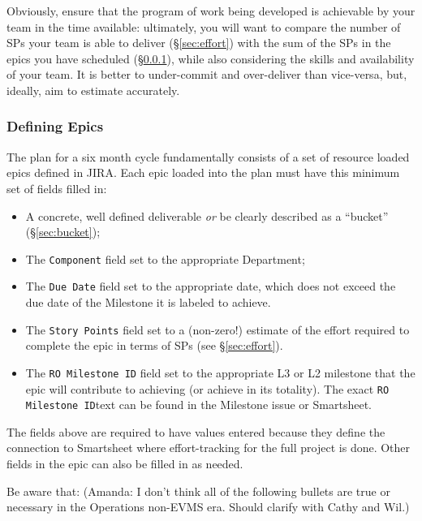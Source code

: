 Obviously, ensure that the program of work being developed is achievable by your team in the time available: ultimately, you will want to compare the number of \glspl{SP} your team is able to deliver (\S\ref{sec:effort}) with the sum of the \glspl{SP} in the \glspl{epic} you have scheduled (\S\ref{sec:planning-epics}), while also considering the skills and availability of your team.
It is better to under-commit and over-deliver than vice-versa, but, ideally, aim to estimate accurately.

\subsubsection{Defining Epics}
\label{sec:planning-epics}

The plan for a six month \gls{cycle} fundamentally consists of a set of resource loaded \glspl{epic} defined in \gls{JIRA}.
Each \gls{epic} loaded into the plan must have this minimum set of fields filled in:

\begin{itemize}
\item
  A concrete, well defined deliverable \emph{or} be clearly described as a ``bucket'' (\S\ref{sec:bucket});
\item
  The \texttt{Component} field set to the appropriate Department;
\item
  The \texttt{Due Date} field set to the appropriate date, which does not exceed the due date of the Milestone it is labeled to achieve.
\item
  The \texttt{Story Points} field set to a (non-zero!) estimate of the effort required to complete the \gls{epic} in terms of \glspl{SP} (see \S\ref{sec:effort}).
\item
  The \texttt{RO Milestone ID} field set to the appropriate L3 or L2 milestone that the epic will contribute to achieving (or achieve in its totality).
  The exact \texttt{RO Milestone ID}text can be found in the Milestone issue or Smartsheet.
\end{itemize}

The fields above are required to have values entered because they define the connection to Smartsheet where effort-tracking for the full project is done. Other fields in the epic can also be filled in as needed. 

Be aware that: (Amanda: I don't think all of the following bullets are true or necessary in the Operations non-EVMS era.  Should clarify with Cathy and Wil.) 

